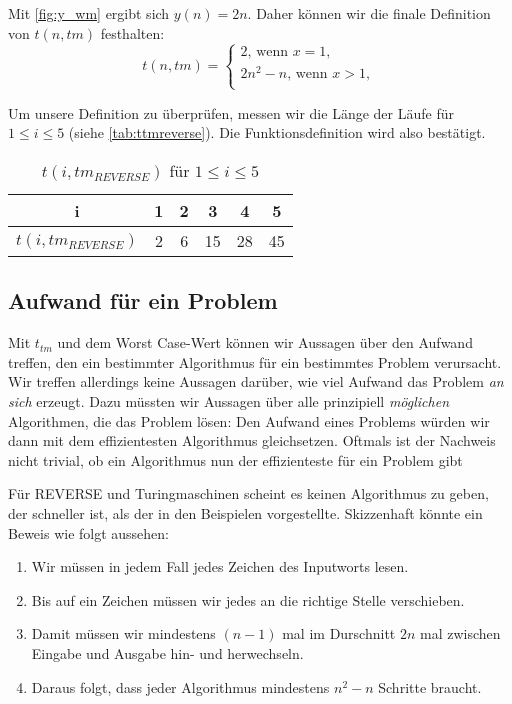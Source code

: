 Mit \autoref{fig:y_wm} ergibt sich $y(n) = 2n$.
Daher können wir die finale Definition von $t(n, tm)$ festhalten:
\[
    t(n, tm) = \begin{cases}
        2\text{, wenn } x = 1,\\
        2 n^2 -n \text{, wenn } x > 1,\\
    \end{cases}
\]

Um unsere Definition zu überprüfen, messen wir die Länge der Läufe für  $1 \leq i \leq 5$
(siehe \autoref{tab:ttmreverse}).
Die Funktionsdefinition wird also bestätigt.
\begin{table}[ht]
    \caption{$t(i,tm_{REVERSE})$ für $1 \leq i \leq 5$}
    \centering
    \begin{tabular}{c c c c c c}
    \toprule
          i
        & 1
        & 2
        & 3
        & 4
        & 5
        \\
        \midrule
          $t(i,tm_{REVERSE})$
        & 2
        & 6
        & 15
        & 28
        & 45
        \\
    \bottomrule
    \end{tabular}%
    \label{tab:ttmreverse}
\end{table}


\subsection{Aufwand für ein Problem}
Mit $t_{tm}$ und dem Worst Case-Wert können wir Aussagen über den Aufwand treffen,
den ein bestimmter Algorithmus für ein bestimmtes Problem verursacht.
Wir treffen allerdings keine Aussagen darüber,
wie viel Aufwand das Problem \emph{an sich} erzeugt.
Dazu müssten wir Aussagen über alle prinzipiell \emph{möglichen} Algorithmen,
die das Problem lösen:
Den Aufwand eines Problems würden wir dann mit dem effizientesten Algorithmus gleichsetzen.
Oftmals ist der Nachweis nicht trivial,
ob ein Algorithmus nun der effizienteste für ein Problem gibt

Für REVERSE und Turingmaschinen scheint es keinen Algorithmus zu geben,
der schneller ist, als der in den Beispielen vorgestellte.
Skizzenhaft könnte ein Beweis wie folgt aussehen:
\begin{enumerate}
        \item Wir müssen in jedem Fall jedes Zeichen des Inputworts lesen.
        \item Bis auf ein Zeichen müssen wir jedes an die richtige Stelle verschieben.
        \item Damit müssen wir mindestens $(n-1)$ mal im Durschnitt $2n$ mal
            zwischen Eingabe und Ausgabe hin- und herwechseln.
        \item Daraus folgt, dass jeder Algorithmus mindestens $n^2 - n$ Schritte braucht.
\end{enumerate}

